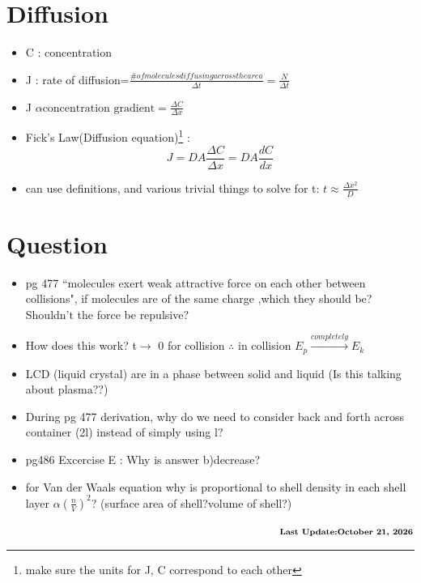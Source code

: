 \documentclass[12 pt, twoside, a4paper] {article}
\begin{document}
\section{Diffusion}
\begin{itemize}
\item C : concentration
\item J : rate of diffusion=$\frac{\# of molecules diffusing across the area}{\Delta t}=\frac{N}{\Delta t}$
\item J $\alpha \text{concentration gradient}=\frac{\Delta C}{\Delta x}$
\item Fick's Law(Diffusion equation)\footnote{make sure the units for J, C correspond to each other } :
	\begin{equation}
		J= DA \frac{\Delta C}{\Delta x}= DA\frac{dC}{dx}
	\end{equation}		
\item can use definitions, and various trivial things to solve for t: $t\approx\frac{\Delta x ^2}{D}$
\end{itemize}
\section{Question}
\begin{itemize}
\item pg 477 ``molecules exert weak attractive force on each other between collisions", if molecules are of the same charge ,which they should be? Shouldn't the force be repulsive?
\item How does this work? t$\rightarrow$ 0 for collision $\therefore$ in collision $E_p \xrightarrow{completely} E_k$
\item LCD (liquid crystal) are in a phase between solid and liquid  (Is this talking about plasma??)
\item During pg 477 derivation, why do we need to consider back and forth across container (2l) instead of simply using l?
\item pg486 Excercise E : Why is answer b)decrease?
\item for Van der Waals equation why is proportional to shell density in each shell layer $\alpha (\frac{n}{V})^2 $?  (surface area of shell?volume of shell?)
\end{itemize}

$\quad \quad \quad  \quad \quad \quad \quad \quad \quad \quad \quad \quad \quad \quad \quad \quad \quad \quad \quad \quad \quad \quad \quad \quad \quad \quad \quad \quad \quad \quad \quad \textbf{Last Update:\today}$
\end{document}
